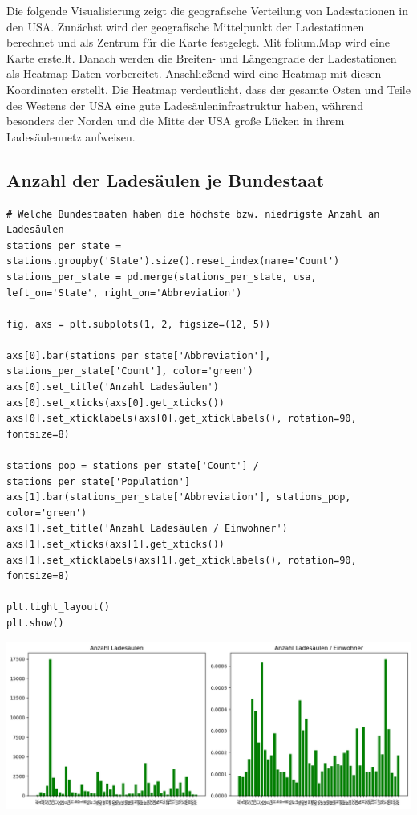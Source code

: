 Die folgende Visualisierung zeigt die geografische Verteilung von Ladestationen in den USA. Zunächst wird der geografische Mittelpunkt der Ladestationen berechnet und als Zentrum für die Karte festgelegt. Mit folium.Map wird eine Karte erstellt. Danach werden die Breiten- und Längengrade der Ladestationen als Heatmap-Daten vorbereitet. Anschließend wird eine Heatmap mit diesen Koordinaten erstellt. Die Heatmap verdeutlicht, dass der gesamte Osten und Teile des Westens der USA eine gute Ladesäuleninfrastruktur haben, während besonders der Norden und die Mitte der USA große Lücken in ihrem Ladesäulennetz aufweisen.

\subsection{Anzahl der Ladesäulen je Bundestaat}

\begin{verbatim}
# Welche Bundestaaten haben die höchste bzw. niedrigste Anzahl an Ladesäulen
stations_per_state = stations.groupby('State').size().reset_index(name='Count')
stations_per_state = pd.merge(stations_per_state, usa, left_on='State', right_on='Abbreviation')

fig, axs = plt.subplots(1, 2, figsize=(12, 5))

axs[0].bar(stations_per_state['Abbreviation'], stations_per_state['Count'], color='green')
axs[0].set_title('Anzahl Ladesäulen')
axs[0].set_xticks(axs[0].get_xticks())
axs[0].set_xticklabels(axs[0].get_xticklabels(), rotation=90, fontsize=8)

stations_pop = stations_per_state['Count'] / stations_per_state['Population']
axs[1].bar(stations_per_state['Abbreviation'], stations_pop, color='green')
axs[1].set_title('Anzahl Ladesäulen / Einwohner')
axs[1].set_xticks(axs[1].get_xticks())
axs[1].set_xticklabels(axs[1].get_xticklabels(), rotation=90, fontsize=8)

plt.tight_layout()
plt.show()
\end{verbatim}

\begin{center}
\includegraphics[scale=0.5]{img/output_4_0.png}
\end{center}

